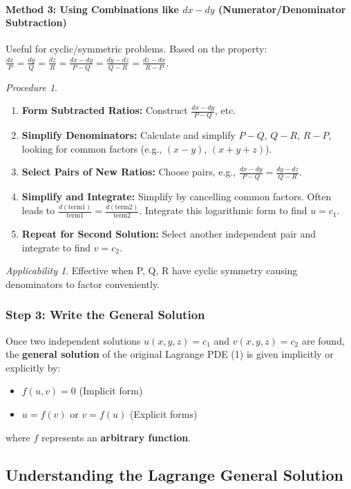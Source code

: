 \documentclass{article}
\theoremstyle{remark}
\newtheorem{procedure}{Procedure}[subsection] %
\newtheorem{applicability}{Applicability}[subsection] %
\begin{document}
	\paragraph{Method 3: Using Combinations like $dx-dy$ (Numerator/Denominator Subtraction)}
	\label{lagrange:method:subtraction}
	Useful for cyclic/symmetric problems.
	Based on the property: $\frac{dx}{P} = \frac{dy}{Q} = \frac{dz}{R} = \frac{dx-dy}{P-Q} = \frac{dy-dz}{Q-R} = \frac{dz-dx}{R-P}$.
	\begin{procedure}
		\begin{enumerate}
			\item \textbf{Form Subtracted Ratios:} Construct $\frac{dx-dy}{P-Q}$, etc.
			\item \textbf{Simplify Denominators:} Calculate and simplify $P-Q$, $Q-R$, $R-P$, looking for common factors (e.g., $(x-y)$, $(x+y+z)$).
			\item \textbf{Select Pairs of New Ratios:} Choose pairs, e.g., $\frac{dx-dy}{P-Q} = \frac{dy-dz}{Q-R}$.
			\item \textbf{Simplify and Integrate:} Simplify by cancelling common factors. Often leads to $\frac{d(\text{term1})}{\text{term1}} = \frac{d(\text{term2})}{\text{term2}}$. Integrate this logarithmic form to find $u=c_1$.
			\item \textbf{Repeat for Second Solution:} Select another independent pair and integrate to find $v=c_2$.
		\end{enumerate}
	\end{procedure}
	\begin{applicability}
		Effective when P, Q, R have cyclic symmetry causing denominators to factor conveniently.
	\end{applicability}
	
	\subsubsection{Step 3: Write the General Solution}
	Once two independent solutions $u(x, y, z) = c_1$ and $v(x, y, z) = c_2$ are found, the \textbf{general solution} of the original Lagrange PDE (1) is given implicitly or explicitly by:
	\begin{itemize}
		\item $f(u, v) = 0$ (Implicit form)
		\item $u = f(v)$ or $v = f(u)$ (Explicit forms)
	\end{itemize}
	where $f$ represents an \textbf{arbitrary function}.
	
	\subsection{Understanding the Lagrange General Solution}
	
\end{document}
